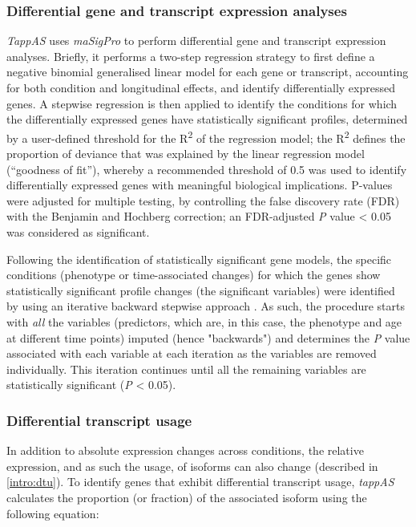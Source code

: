 \subsubsection{Differential gene and transcript expression analyses}
\label{diffrential_exp}
\textit{TappAS} uses \textit{maSigPro} to perform differential gene and transcript expression analyses\cite{Nueda2014}. Briefly, it performs a two-step regression strategy to first define a negative binomial generalised linear model\cite{Nueda2014} for each gene or transcript, accounting for both condition and longitudinal effects, and identify differentially expressed genes. A stepwise regression is then applied to identify the conditions for which the differentially expressed genes have statistically significant profiles, determined by a user-defined threshold for the R\textsuperscript{2} of the regression model; the R\textsuperscript{2} defines the proportion of deviance that was explained by the linear regression model (“goodness of fit”), whereby a recommended threshold of 0.5 was used to identify differentially expressed genes with meaningful biological implications\cite{Conesa2006}. P-values were adjusted for multiple testing, by controlling the false discovery rate (FDR) with the Benjamin and Hochberg correction; an FDR-adjusted \textit{P} value < 0.05 was considered as significant.

Following the identification of statistically significant gene models, the specific conditions (phenotype or time-associated changes) for which the genes show statistically significant profile changes (the significant variables) were identified by using an iterative backward stepwise approach \cite{Conesa2017}. As such, the procedure starts with \textit{all} the variables (predictors, which are, in this case, the phenotype and age at different time points) imputed (hence "backwards") and determines the \textit{P} value associated with each variable at each iteration as the variables are removed individually. This iteration continues until all the remaining variables are statistically significant (\textit{P} < 0.05). 

\subsubsection{Differential transcript usage}
\label{ch:diu_method}
In addition to absolute expression changes across conditions, the relative expression, and as such the usage, of isoforms can also change (described in \cref{intro:dtu}). To identify genes that exhibit differential transcript usage, \textit{tappAS} calculates the proportion (or fraction) of the associated isoform using the following equation:

